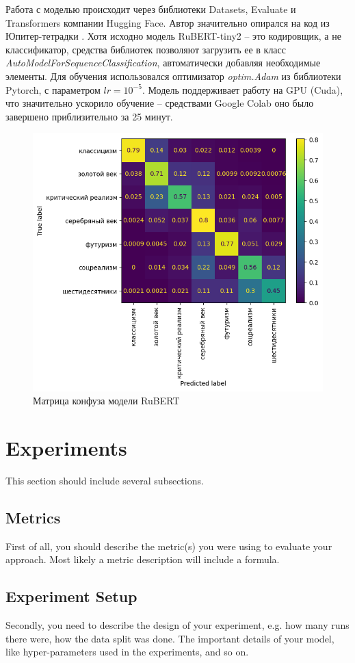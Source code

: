 \documentclass[a4paper,12pt]{article}
\begin{document}
Работа с моделью происходит через библиотеки Datasets, Evaluate и Transformers компании Hugging Face. Автор значительно опирался на код из Юпитер-тетрадки \cite{rubert_notebook}. Хотя исходно модель RuBERT-tiny2 -- это кодировщик, а не классификатор, средства библиотек позволяют загрузить ее в класс \textit{AutoModelForSequenceClassification}, автоматически добавляя необходимые элементы. Для обучения использовался оптимизатор \textit{optim.Adam} из библиотеки Pytorch, с параметром $lr = 10^{-5}$. Модель поддерживает работу на GPU (Cuda), что значительно ускорило обучение -- средствами Google Colab оно было завершено приблизительно за 25 минут.

\begin{figure}[!tbh]
    \centering
    \includegraphics[width=0.7\linewidth]{figures/rubert_confusion_matrix.png}
    \caption{Матрица конфуза модели RuBERT}
    \label{fig:rubert_confusion}
\end{figure}

\section{Experiments}
This section should include several subsections.
\subsection{Metrics}
First of all, you should describe the metric(s) you were using to evaluate your approach. Most likely a metric description will include a formula.

\subsection{Experiment Setup}
Secondly, you need to describe the design of your experiment, e.g. how many runs there were, how the data split was done. The important details of your model, like hyper-parameters used in the experiments, and so on.
\end{document}
